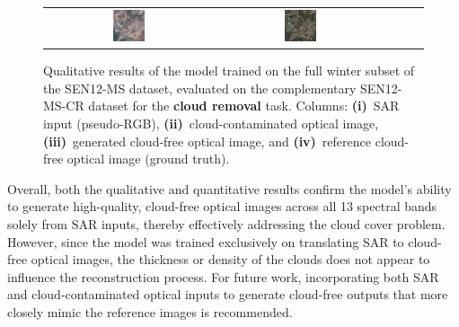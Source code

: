 \begin{figure}[h!]
\begin{tabular}{c *{4}{c}}
        \includegraphics[width=0.2\textwidth, height=0.2\textheight, keepaspectratio]{img/cloud_removal/sample_000150_pred_rgb.png} &
        \includegraphics[width=0.2\textwidth, height=0.2\textheight, keepaspectratio]{img/cloud_removal/sample_000150_true_rgb.png} \\
    \end{tabular}

    \caption[Qualitative results on cloud removal]{%
    Qualitative results of the model trained on the full winter subset of the SEN12-MS dataset, evaluated on the complementary SEN12-MS-CR dataset for the \textbf{cloud removal} task.  
    Columns: 
    \textbf{(i)}~SAR input (pseudo-RGB), 
    \textbf{(ii)}~cloud-contaminated optical image, 
    \textbf{(iii)}~generated cloud-free optical image, and 
    \textbf{(iv)}~reference cloud-free optical image (ground truth).}
    \label{fig:qualitative_results_cloud_removal}
\end{figure}

Overall, both the qualitative and quantitative results confirm the model’s ability to generate high-quality, cloud-free optical images across all 13 spectral bands solely from SAR inputs, thereby effectively addressing the cloud cover problem. However, since the model was trained exclusively on translating SAR to cloud-free optical images, the thickness or density of the clouds does not appear to influence the reconstruction process. For future work, incorporating both SAR and cloud-contaminated optical inputs to generate cloud-free outputs that more closely mimic the reference images is recommended.
